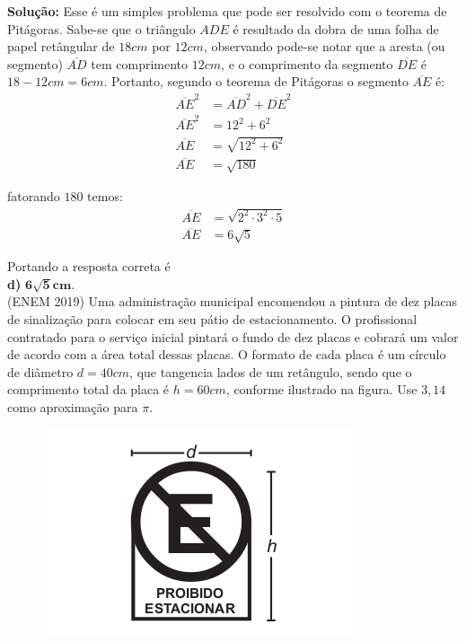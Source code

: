 \begin{multicols*}{2}
    \noindent \textbf{Solução:} 
    Esse é um simples problema que pode ser resolvido com o teorema de Pitágoras.
    Sabe-se que o triângulo $ADE$ é resultado da dobra de uma folha de papel retângular
    de $18 cm$ por $12 cm$, observando pode-se notar que a aresta (ou segmento) 
    $\overline{AD}$ tem comprimento $12cm$, e o comprimento da segmento $\overline{DE}$
    é $18-12 cm = 6cm$. Portanto, segundo o teorema de Pitágoras o segmento 
    $\overline{AE}$ é:
    \begin{align}
        \overline{AE}^2 &= \overline{AD}^2 + \overline{DE}^2\\
        \overline{AE}^2 &= 12^2 + 6^2\\
        \overline{AE} &= \sqrt{12^2+6^2}\\
        \overline{AE} &= \sqrt{180}
    \end{align}
    
    \noindent fatorando $180$ temos:
    \begin{align}
        \overline{AE} &= \sqrt{2^2\cdot 3^2\cdot 5}\\
        \overline{AE} &= 6\sqrt{5}
    \end{align}

    \noindent Portando a resposta correta é \\\textbf{d)} $\mathbf{6\sqrt{5}cm}$.\\


    \noindent 
    \execnum (ENEM 2019) Uma administração municipal encomendou a pintura
    de dez placas de sinalização para colocar em seu pátio
    de estacionamento.
    O profissional contratado para o serviço inicial
    pintará o fundo de dez placas e cobrará um valor de
    acordo com a área total dessas placas. O formato
    de cada placa é um círculo de diâmetro $d = 40 cm$,
    que tangencia lados de um retângulo, sendo que
    o comprimento total da placa é $h = 60 cm$, conforme
    ilustrado na figura. Use $3,14$ como aproximação para $\pi$.

    \begin{figure}[H]
        \includegraphics[width=\columnwidth]{assets/enem2019-151.png}
    \end{figure}


\end{multicols*}
